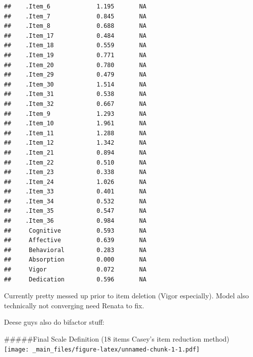 \documentclass[
]{book}
\begin{document}
\begin{verbatim}
##    .Item_6             1.195       NA                  
##    .Item_7             0.845       NA                  
##    .Item_8             0.688       NA                  
##    .Item_17            0.484       NA                  
##    .Item_18            0.559       NA                  
##    .Item_19            0.771       NA                  
##    .Item_20            0.780       NA                  
##    .Item_29            0.479       NA                  
##    .Item_30            1.514       NA                  
##    .Item_31            0.538       NA                  
##    .Item_32            0.667       NA                  
##    .Item_9             1.293       NA                  
##    .Item_10            1.961       NA                  
##    .Item_11            1.288       NA                  
##    .Item_12            1.342       NA                  
##    .Item_21            0.894       NA                  
##    .Item_22            0.510       NA                  
##    .Item_23            0.338       NA                  
##    .Item_24            1.026       NA                  
##    .Item_33            0.401       NA                  
##    .Item_34            0.532       NA                  
##    .Item_35            0.547       NA                  
##    .Item_36            0.984       NA                  
##     Cognitive          0.593       NA                  
##     Affective          0.639       NA                  
##     Behavioral         0.283       NA                  
##     Absorption         0.000       NA                  
##     Vigor              0.072       NA                  
##     Dedication         0.596       NA
\end{verbatim}

Currently pretty messed up prior to item deletion (Vigor especially). Model also technically not converging need Renata to fix.

Deese guys also do bifactor stuff: \citet{mansolf_when_2017}

\#\#\#\#\#Final Scale Definition (18 items Casey's item reduction method) \texttt{[image: \_main\_files/figure-latex/unnamed-chunk-1-1.pdf]}
\end{document}
